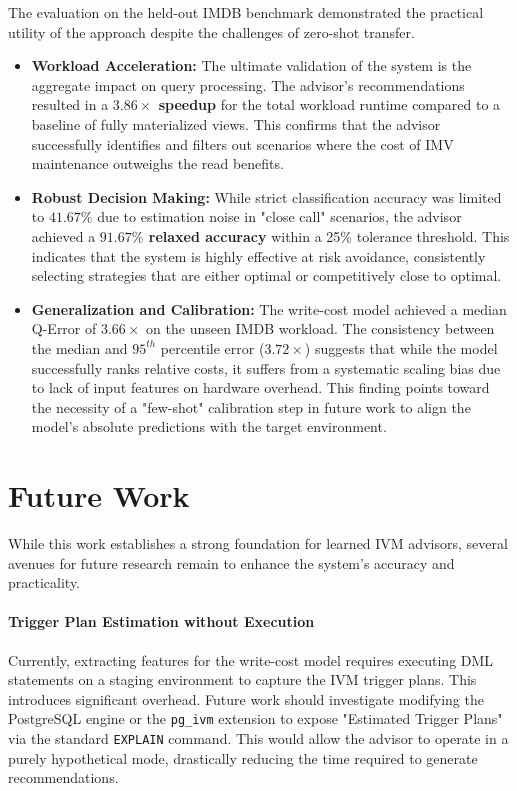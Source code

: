 The evaluation on the held-out IMDB benchmark demonstrated the practical utility of the approach despite the challenges of zero-shot transfer.
\begin{itemize}
    \item \textbf{Workload Acceleration:} The ultimate validation of the system is the aggregate impact on query processing. The advisor's recommendations resulted in a \textbf{$3.86\times$ speedup} for the total workload runtime compared to a baseline of fully materialized views. This confirms that the advisor successfully identifies and filters out scenarios where the cost of \ac{IMV} maintenance outweighs the read benefits.
    \item \textbf{Robust Decision Making:} While strict classification accuracy was limited to $41.67\%$ due to estimation noise in "close call" scenarios, the advisor achieved a \textbf{$91.67\%$ relaxed accuracy} within a 25\% tolerance threshold. This indicates that the system is highly effective at risk avoidance, consistently selecting strategies that are either optimal or competitively close to optimal.
    \item \textbf{Generalization and Calibration:} The write-cost model achieved a median Q-Error of $3.66\times$ on the unseen IMDB workload. The consistency between the median and $95^{th}$ percentile error ($3.72\times$) suggests that while the model successfully ranks relative costs, it suffers from a systematic scaling bias due to lack of input features on hardware overhead. This finding points toward the necessity of a "few-shot" calibration step in future work to align the model's absolute predictions with the target environment.
\end{itemize}

\section{Future Work}
\label{sec:future_work}

While this work establishes a strong foundation for learned \ac{IVM} advisors, several avenues for future research remain to enhance the system's accuracy and practicality.

\paragraph{Trigger Plan Estimation without Execution}
Currently, extracting features for the write-cost model requires executing \ac{DML} statements on a staging environment to capture the \ac{IVM} trigger plans. This introduces significant overhead. Future work should investigate modifying the PostgreSQL engine or the \texttt{pg\_ivm} extension to expose "Estimated Trigger Plans" via the standard \texttt{EXPLAIN} command. This would allow the advisor to operate in a purely hypothetical mode, drastically reducing the time required to generate recommendations.

